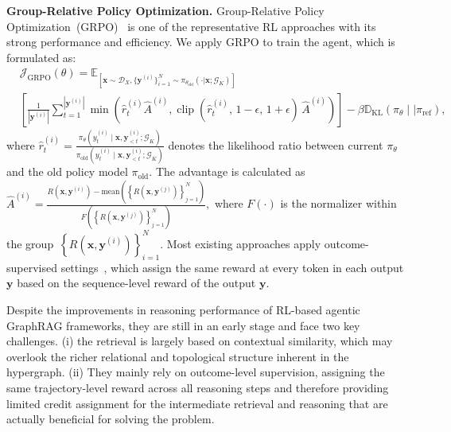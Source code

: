 \noindent\textbf{Group-Relative Policy Optimization.}
Group-Relative Policy Optimization~(GRPO)~\citep{shao2024deepseekmath, deepseekai2025deepseekv32} is one of the representative RL approaches with its strong performance and efficiency.
We apply GRPO to train the agent, which is formulated as:
\begin{equation}
\begin{split}
&\mathcal{J}_{\mathrm{GRPO}}(\theta)
= \mathbb{E}_{\left[\boldsymbol{x} \sim \mathcal{D}_X, \{\boldsymbol{y}^{(i)}\}_{i=1}^N \sim \pi_{\theta_{\text{old}}}(\cdot | \boldsymbol{x}; \mathcal{G}_K)\right]}
\\
&\left[
\frac{1}{\left\lvert \boldsymbol{y}^{(i)} \right\rvert}\sum_{t=1}^{\left\lvert \boldsymbol{y}^{(i)} \right\rvert}
\min\left(
\hat{r}_{t}^{(i)}\hat{A}^{(i)},\operatorname{clip}\!\left(\hat{r}_{t}^{(i)},\, 1 -  \epsilon,\, 1 +\epsilon\right)\,\hat{A}^{(i)}
\right)
\right]
-\beta \mathbb{D}_{\text{KL}}\left(\pi_\theta \mid\mid \pi_{\text{ref}} \right),
\end{split}
\end{equation}
where $\hat{r}_{t}^{(i)} = \frac{\pi_\theta\left( {y}^{(i)}_t \mid \boldsymbol{x}, \boldsymbol{y}_{<t}^{(i)}; \mathcal{G}_K\right)}{\pi_\text{old}\left(y_t^{(i)}\mid \boldsymbol{x}, \boldsymbol{y}_{<t}^{(i)}; \mathcal{G}_K\right)}$ denotes the likelihood ratio between current $\pi_\theta$ and the old policy model $\pi_{\text{old}}$. 
The advantage is calculated as $\hat{{A}}^{(i)} =  \frac{R\left(\boldsymbol{x}, \boldsymbol{y}^{(i)}\right)-\text{mean}\left(\left\{R\left(\boldsymbol{x},\boldsymbol{y}^{(j)} \right) \right\}_{j=1}^N \right)}{F\left(\left\{R\left(\boldsymbol{x},\boldsymbol{y}^{(j)} \right) \right\}_{j=1}^N \right)},$
where $F\left(\cdot \right)$ is the normalizer within the group~$\left\{R\left(\boldsymbol{x},\boldsymbol{y}^{(i)}
\right)\right\}_{i=1}^N$.
Most existing approaches apply outcome-supervised settings~\citep{guo2025deepseek}, which assign the same reward at every token in each output $\boldsymbol{y}$ based on the sequence-level reward of the output $\boldsymbol{y}$.

Despite the improvements in reasoning performance of RL-based agentic GraphRAG frameworks, they are still in an early stage and face two key challenges.
(i) the retrieval is largely based on contextual similarity, which may overlook the richer relational and topological structure inherent in the hypergraph.
(ii) They mainly rely on outcome-level supervision, assigning the same trajectory-level reward across all reasoning steps and therefore providing limited credit assignment for the intermediate retrieval and reasoning that are actually beneficial for solving the problem.
